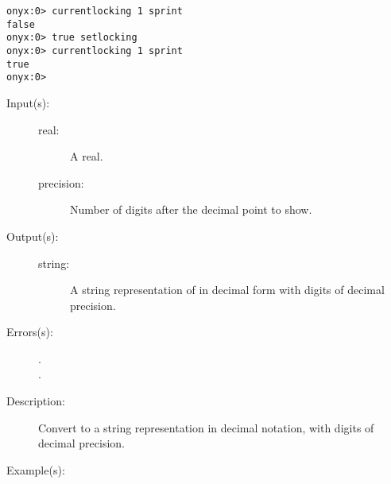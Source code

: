 \begin{description}
\begin{description}
\begin{verbatim}
onyx:0> currentlocking 1 sprint
false
onyx:0> true setlocking
onyx:0> currentlocking 1 sprint
true
onyx:0>
		\end{verbatim}
	\end{description}
\label{systemdict:cvds}
\item[{\onyxop{real precision}{cvds}{string}}: ]
	\begin{description}\item[]
	\item[Input(s): ]
		\begin{description}\item[]
		\item[real: ]
			A real.
		\item[precision: ]
			Number of digits after the decimal point to show.
		\end{description}
	\item[Output(s): ]
		\begin{description}\item[]
		\item[string: ]
			A string representation of  in decimal form
			with  digits of decimal precision.
		\end{description}
	\item[Errors(s): ]
		\begin{description}\item[]
		\item[.]
		\item[.]
		\end{description}
	\item[Description: ]
		Convert  to a string representation in decimal
		notation, with  digits of decimal precision.
	\item[Example(s): ]\begin{verbatim}


\end{verbatim}
\end{description}
\end{description}
